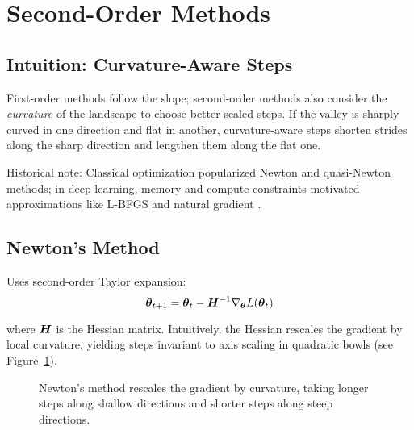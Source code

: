 
\section{Second-Order Methods }
\label{sec:second-order}

\subsection{Intuition: Curvature-Aware Steps}

First-order methods follow the slope; second-order methods also consider the \textit{curvature} of the landscape to choose better-scaled steps. If the valley is sharply curved in one direction and flat in another, curvature-aware steps shorten strides along the sharp direction and lengthen them along the flat one.

Historical note: Classical optimization popularized Newton and quasi-Newton methods; in deep learning, memory and compute constraints motivated approximations like L-BFGS and natural gradient \cite{LiuNocedal1989,Amari1998,GoodfellowEtAl2016,Bishop2006}.

\subsection{Newton's Method}

Uses second-order Taylor expansion:
\begin{equation}
\boldsymbol{\theta}_{t+1} = \boldsymbol{\theta}_t - \boldsymbol{H}^{-1} \nabla_{\boldsymbol{\theta}} L(\boldsymbol{\theta}_t)
\end{equation}

where $\boldsymbol{H}$ is the Hessian matrix. Intuitively, the Hessian rescales the gradient by local curvature, yielding steps invariant to axis scaling in quadratic bowls (see Figure~\ref{fig:newton-bowl}).

\begin{figure}[h]
\centering
{}
\caption{Newton's method rescales the gradient by curvature, taking longer steps along shallow directions and shorter steps along steep directions.}
\label{fig:newton-bowl}
\end{figure}


